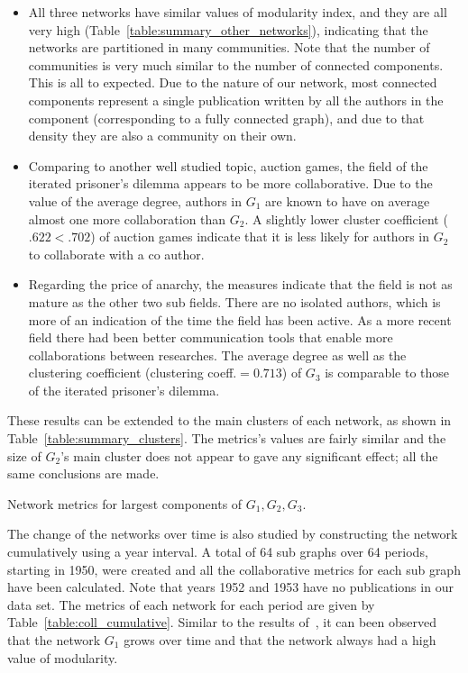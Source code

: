 \documentclass{article}
\theoremstyle{definition}
\begin{document}
\begin{itemize}
    \item All three networks have similar values of modularity index, and they are
    all very high (Table~\ref{table:summary_other_networks}), indicating that the
    networks are partitioned in many communities.
    Note that the number of
    communities is very much similar to the number of connected components.
    This is all to expected. Due to the nature of our network, most connected
    components represent a single publication written by all the authors in the
    component (corresponding to a fully connected graph), and due to that density
    they are also a community on their own.
    \item Comparing to another well studied topic, auction games, the field of the
    iterated prisoner's dilemma appears to be more collaborative. Due to the
    value of the average degree, authors in \(G_1\) are known to have on average almost
    one more collaboration than \(G_2\). A slightly lower cluster coefficient ($ .622 < .702$)
    of auction games indicate that it is less likely for authors in \(G_2\) to collaborate
    with a co author.
    \item Regarding the price of anarchy, the measures indicate that the field
    is not as mature as the other two sub fields. There are no isolated authors,
    which is more of an indication of the time the field has been active. As a
    more recent field there had been better communication tools that enable more
    collaborations between researches. The average degree as well as the clustering
    coefficient (clustering coeff.$=0.713$) of \(G_3\) is comparable to those
    of the iterated prisoner's dilemma.
\end{itemize}

These results can be extended to the main clusters of each network, as shown in
Table~\ref{table:summary_clusters}. The metrics's values are fairly similar and
the size of \(G_2\)'s main cluster does not appear to gave any significant
effect; all the same conclusions are made.

\begin{table}[!hbtp]
    \centering
    \resizebox{\textwidth}{!}{
    }
    \caption{Network metrics for largest components of \(G_1, G_2, G_3\).}\label{table:summary_clusters}
\end{table}

The change of the networks over time is also studied by constructing the network
cumulatively using a year interval. A total of 64 sub graphs
over 64 periods, starting in 1950, were created and all the collaborative metrics
for each sub graph have been calculated. Note that years 1952 and 1953 have no
publications in our data set. The metrics of each network for each period are given by
Table~\ref{table:coll_cumulative}.
Similar to the results of~\cite{Liu2015}, it can been observed that the network \(G_1\)
grows over time and that the network always had a high value of modularity.
\end{document}
